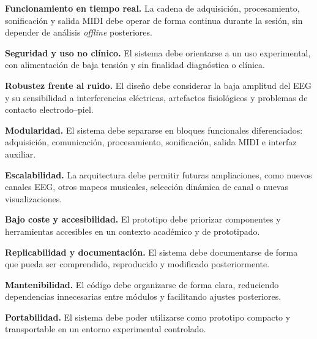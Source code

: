 \documentclass[../main.tex]{subfiles}
\begin{document}
\begin{description}[leftmargin=!,labelwidth=2cm]

    \item[RNF-1] \textbf{Funcionamiento en tiempo real.} La cadena de adquisición, procesamiento, sonificación y salida MIDI debe operar de forma continua durante la sesión, sin depender de análisis \textit{offline} posteriores.

    \item[RNF-2] \textbf{Seguridad y uso no clínico.} El sistema debe orientarse a un uso experimental, con alimentación de baja tensión y sin finalidad diagnóstica o clínica.

    \item[RNF-3] \textbf{Robustez frente al ruido.} El diseño debe considerar la baja amplitud del EEG y su sensibilidad a interferencias eléctricas, artefactos fisiológicos y problemas de contacto electrodo--piel.

    \item[RNF-4] \textbf{Modularidad.} El sistema debe separarse en bloques funcionales diferenciados: adquisición, comunicación, procesamiento, sonificación, salida MIDI e interfaz auxiliar.

    \item[RNF-5] \textbf{Escalabilidad.} La arquitectura debe permitir futuras ampliaciones, como nuevos canales EEG, otros mapeos musicales, selección dinámica de canal o nuevas visualizaciones.

    \item[RNF-6] \textbf{Bajo coste y accesibilidad.} El prototipo debe priorizar componentes y herramientas accesibles en un contexto académico y de prototipado.

    \item[RNF-7] \textbf{Replicabilidad y documentación.} El sistema debe documentarse de forma que pueda ser comprendido, reproducido y modificado posteriormente.

    \item[RNF-8] \textbf{Mantenibilidad.} El código debe organizarse de forma clara, reduciendo dependencias innecesarias entre módulos y facilitando ajustes posteriores.

    \item[RNF-9] \textbf{Portabilidad.} El sistema debe poder utilizarse como prototipo compacto y transportable en un entorno experimental controlado.

\end{description}
\end{document}
